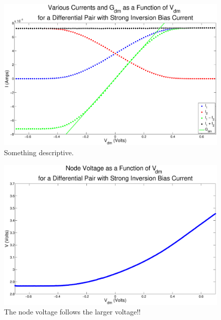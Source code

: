 \documentclass{article}
\begin{document}
\begin{figure}[H]
\centering
\includegraphics[width=\linewidth]{./Figures/AllCurrentsStrongInversion.eps}
\caption{Something descriptive. }
\label{fig:AllCurrentsStrongInversion }
\end{figure}


\begin{figure}[H]
\centering
\includegraphics[width=\linewidth]{./Figures/NodeVoltageStrongInversion.eps}
\caption{The node voltage follows the larger voltage!!}
\label{fig:nodevoltageSI}
\end{figure}
\end{document}
